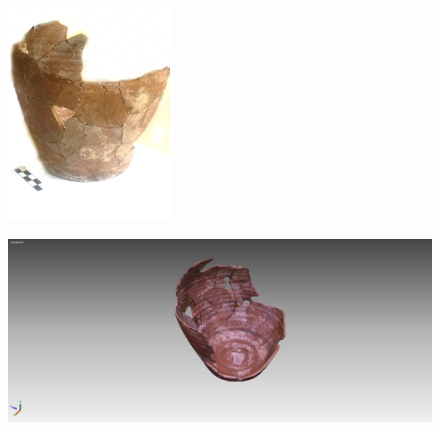 \documentclass{beamer}
\begin{document}
		\begin{frame}
			\begin{multicols}{2}[][]
				\begin{figure}[]
					\begin{center}
						\includegraphics[width=1\linewidth]{snap3d/pentola1}
					\end{center}
					\label{fig:pentola1}
				\end{figure}
				\begin{figure}[]
					\begin{center}
						\includegraphics[width=1\linewidth,trim=230 0 200 0,clip=true]{snap3d/pentola2}
					\end{center}
					\label{fig:pentola2}
				\end{figure}
			\end{multicols}
		\end{frame}
\end{document}
